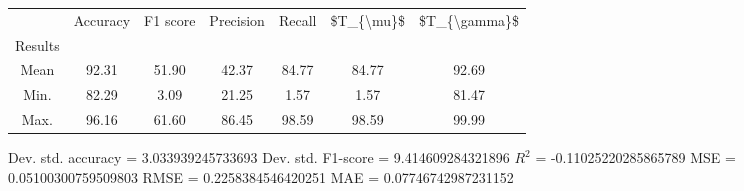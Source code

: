 \begin{tabular}{|c|c|c|c|c|c|c|}
\toprule
{} &  Accuracy &  F1 score &  Precision &  Recall &  \$T\_\{\textbackslash mu\}\$ &  \$T\_\{\textbackslash gamma\}\$ \\
Results &           &           &            &         &            &               \\
\hline
Mean    &     92.31 &     51.90 &      42.37 &   84.77 &      84.77 &         92.69 \\
Min.    &     82.29 &      3.09 &      21.25 &    1.57 &       1.57 &         81.47 \\
Max.    &     96.16 &     61.60 &      86.45 &   98.59 &      98.59 &         99.99 \\
\bottomrule
\end{tabular}

 Dev. std. accuracy = 3.033939245733693
 Dev. std. F1-score = 9.414609284321896
 $R^2$ = -0.11025220285865789
 MSE = 0.05100300759509803
 RMSE = 0.2258384546420251
 MAE = 0.07746742987231152